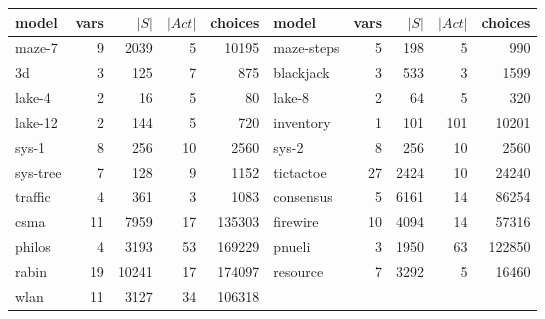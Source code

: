 \begin{tabular}{l rrrr@{\hskip 32pt}l rrrr}
\toprule
\multirow{1}{*}{model} & vars & $|S|$ & $|Act|$ & choices & \multirow{1}{*}{model} & vars & $|S|$ & $|Act|$ & choices \\
\midrule
maze-7 & 9 & 2039 & 5 & 10195 & maze-steps & 5 & 198 & 5 & 990 \\
3d & 3 & 125 & 7 & 875 & blackjack & 3 & 533 & 3 & 1599 \\
lake-4 & 2 & 16 & 5 & 80 & lake-8 & 2 & 64 & 5 & 320 \\
lake-12 & 2 & 144 & 5 & 720 & inventory & 1 & 101 & 101 & 10201 \\
sys-1 & 8 & 256 & 10 & 2560 & sys-2 & 8 & 256 & 10 & 2560 \\
sys-tree & 7 & 128 & 9 & 1152 & tictactoe & 27 & 2424 & 10 & 24240 \\
traffic & 4 & 361 & 3 & 1083 & consensus & 5 & 6161 & 14 & 86254 \\
csma & 11 & 7959 & 17 & 135303 & firewire & 10 & 4094 & 14 & 57316 \\
philos & 4 & 3193 & 53 & 169229 & pnueli & 3 & 1950 & 63 & 122850 \\
rabin & 19 & 10241 & 17 & 174097 & resource & 7 & 3292 & 5 & 16460 \\
wlan & 11 & 3127 & 34 & 106318 &  &  &  &  &  \\
\bottomrule
\end{tabular}
